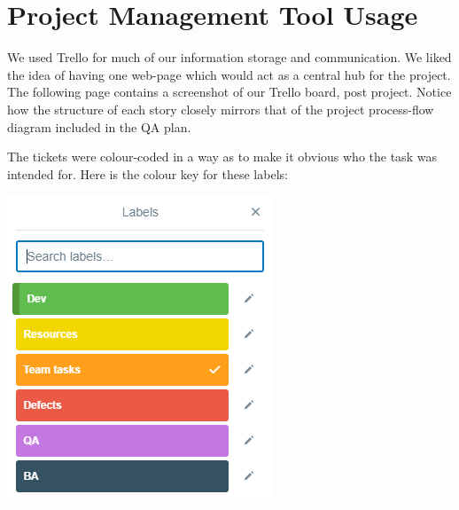 \documentclass[12pt]{article}
\begin{document}
\section{Project Management Tool Usage}

We used Trello for much of our information storage and communication. We liked the idea of having one web-page which would act as a central hub for the project. The following page contains a screenshot of our Trello board, post project. Notice how the structure of each story closely mirrors that of the project process-flow diagram included in the QA plan.

\noindent{}

The tickets were colour-coded in a way as to make it obvious who the task was intended for. Here is the colour key for these labels:

\begin{center}
    \includegraphics{images/trello2.png}
\end{center}
\end{document}
